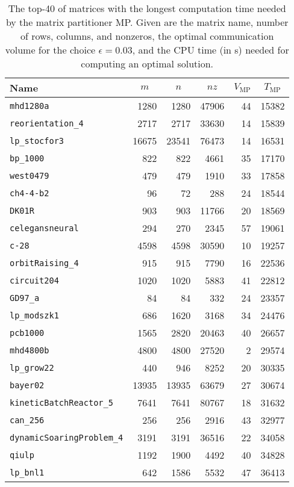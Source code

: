\begin{table}[p]
\caption{The top-40 of matrices with the longest computation time needed by
the matrix partitioner MP. Given are the matrix name, number of rows, columns, and nonzeros,
the optimal communication volume for the choice $\epsilon=0.03$,
and the CPU time (in s) needed for computing 
an optimal solution.}
\label{tbl:matrices}

\begin{center}
\begin{tabular}{lrrrrr}
\hline
Name&\multicolumn{1}{c}{$m$}&
\multicolumn{1}{c}{$n$}&
\multicolumn{1}{c}{$nz$}&
\multicolumn{1}{c}{$V_{\mathrm{MP}}$}&
\multicolumn{1}{c}{$T_{\mathrm{MP}}$}\\
\hline
\hline
\texttt{mhd1280a}&1280&1280&47906&44&15382\\
\texttt{reorientation\_4}&2717&2717&33630&14&15839\\
\texttt{lp\_stocfor3}&16675&23541&76473&14&16531\\
\texttt{bp\_1000}&822&822&4661&35&17170\\
\texttt{west0479}&479&479&1910&33&17858\\
\texttt{ch4-4-b2}&96&72&288&24&18544\\
\texttt{DK01R}&903&903&11766&20&18569\\
\texttt{celegansneural}&294&270&2345&57&19061\\
\texttt{c-28}&4598&4598&30590&10&19257\\
\texttt{orbitRaising\_4}&915&915&7790&16&22536\\
\texttt{circuit204}&1020&1020&5883&41&22812\\
\texttt{GD97\_a}&84&84&332&24&23357\\
\texttt{lp\_modszk1}&686&1620&3168&34&24476\\
\texttt{pcb1000}&1565&2820&20463&40&26657\\
\texttt{mhd4800b}&4800&4800&27520&2&29574\\
\texttt{lp\_grow22}&440&946&8252&20&30335\\
\texttt{bayer02}&13935&13935&63679&27&30674\\
\texttt{kineticBatchReactor\_5}&7641&7641&80767&18&31632\\
\texttt{can\_256}&256&256&2916&43&32977\\
\texttt{dynamicSoaringProblem\_4}&3191&3191&36516&22&34058\\
\texttt{qiulp}&1192&1900&4492&40&34828\\
\texttt{lp\_bnl1}&642&1586&5532&47&36413\\

\end{tabular}
\end{center}
\end{table}
